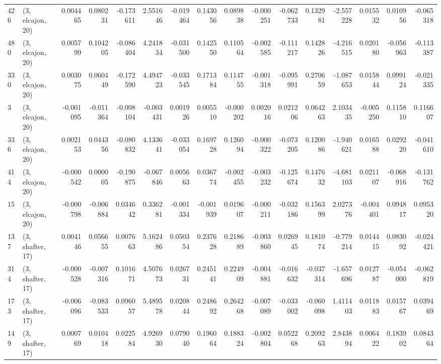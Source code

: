 \begin{tabular}{llrrrrrrrrrrrrrr}
426 &  (3, elcajon, 20) &   0.004465 &  0.080231 & -0.173611 &    2.551646 & -0.019464 &   0.143056 &  0.089838 & -0.000251 & -0.062733 &  0.132981 &    -2.557228 &  0.015532 &  0.010956 & -0.065318 \\
480 &  (3, elcajon, 20) &   0.005799 &  0.104205 & -0.086404 &    4.241834 & -0.031500 &   0.142550 &  0.110564 & -0.002585 & -0.111217 &  0.142826 &    -4.216515 &  0.020180 & -0.056963 & -0.113387 \\
330 &  (3, elcajon, 20) &   0.003075 &  0.060449 & -0.172590 &    4.494723 & -0.033545 &   0.171384 &  0.114755 & -0.001318 & -0.095991 &  0.270659 &    -1.087653 &  0.015844 &  0.099124 & -0.021335 \\
3   &  (3, elcajon, 20) &  -0.001095 & -0.011364 & -0.008104 &   -0.003431 &  0.001926 &   0.005510 & -0.000202 &  0.002016 &  0.021206 &  0.064263 &     2.103435 & -0.005250 &  0.115810 &  0.116607 \\
336 &  (3, elcajon, 20) &   0.002153 &  0.044356 & -0.080832 &    4.133641 & -0.033054 &   0.169728 &  0.126094 & -0.000322 & -0.073205 &  0.120086 &    -1.940621 &  0.016588 &  0.029220 & -0.041610 \\
414 &  (3, elcajon, 20) &  -0.000542 &  0.000005 & -0.190875 &   -0.067846 &  0.005663 &   0.036774 & -0.002455 & -0.003232 & -0.125674 &  0.147632 &    -4.681103 &  0.021107 & -0.068916 & -0.131762 \\
15  &  (3, elcajon, 20) &  -0.000798 & -0.006884 &  0.034642 &    0.336281 & -0.001334 &  -0.001939 &  0.019607 & -0.000211 & -0.032186 &  0.156399 &     2.027376 & -0.004401 &  0.094817 &  0.095320 \\
137 &  (3, shafter, 17) &   0.004146 &  0.056655 &  0.007663 &    5.162486 &  0.050354 &   0.237628 &  0.218689 & -0.003860 &  0.026945 &  0.181074 &    -0.779214 &  0.014415 &  0.083092 & -0.024421 \\
314 &  (3, shafter, 17) &  -0.000528 & -0.007316 &  0.101671 &    4.507673 &  0.026731 &   0.245141 &  0.224909 & -0.004881 & -0.016632 & -0.037314 &    -1.657696 &  0.012787 & -0.054000 & -0.062819 \\
173 &  (3, shafter, 17) &  -0.006096 & -0.083533 &  0.096057 &    5.489578 &  0.020844 &   0.248692 &  0.264268 & -0.007089 & -0.033002 & -0.060098 &     1.411403 &  0.011883 &  0.015767 &  0.039469 \\
149 &  (3, shafter, 17) &   0.000769 &  0.010418 &  0.022584 &    4.926930 &  0.079040 &   0.196064 &  0.188324 & -0.002804 &  0.052268 &  0.209263 &     2.843894 &  0.006422 &  0.183902 &  0.084364 \\

\end{tabular}
